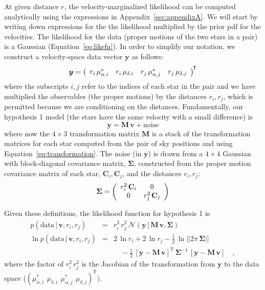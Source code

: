 \documentclass[manuscript, letterpaper]{aastex6}
\newcommand{\eqname}{Equation}
\newcommand{\given}{\,|\,}
\newcommand{\normal}{{\mathcal{N}}}
\newcommand{\transp}[1]{{#1}^{\!\mathsf{T}}}
\newcommand{\inv}[1]{{#1}^{-1}}
\newcommand{\bs}[1]{\boldsymbol{#1}}
\newcommand{\mat}[1]{\mathbf{#1}}
\renewcommand{\vec}[1]{\bs{#1}}
\newcommand{\data}{\mathrm{data}}
\begin{document}
At given distance $r$, the velocity-marginalized likelihood can be computed
analytically using the expressions in Appendix~\ref{sec:appendixA}.
We will start by writing down expressions for the the likelihood multiplied by
the prior pdf for the velocities.
The likelihood for the data (proper motions of the two stars in a pair)
is a Gaussian (\eqname~\ref{eq:likefn}).
In order to simplify our notation,
we construct a velocity-space data vector $\vec{y}$ as follows:
\begin{equation}
  \vec{y} =
    \transp{\left(
      \begin{array}{c c c c}
        r_i\,\mu_{\alpha,i}^* &
        r_i\,\mu_{\delta,i} &
        r_j\,\mu_{\alpha,j}^* &
        r_j\,\mu_{\delta,j}
      \end{array}
    \right)}
\end{equation}
where the subscripts $i,j$ refer to the indices of each star in the pair
and we have multiplied the observables (the proper motions) by the distances
$r_i, r_j$, which is permitted because we are conditioning on the distances.
Fundamentally, our hypothesis 1 model (the stars have the same velocity with a
small difference) is
\begin{equation}
  \vec{y} = \mat{M} \, \vec{v} + \mathrm{noise}
\end{equation}
where now the $4 \times 3$ transformation matrix $\mat{M}$ is a stack of the
transformation matrices for each star computed from the pair of sky positions
and using \eqname~\ref{eq:transformation}.
The noise (in $\vec{y}$) is drawn from a $4 \times 4$ Gaussian with
block-diagonal covariance matrix, $\mat{\Sigma}$, constructed from
the proper motion covariance matrix of each star,
$\mat{C}_i, \mat{C}_j$, and the distances
$r_i, r_j$:
\begin{equation}
  \mat{\Sigma} = \left(
    \begin{array}{c c}
      r_i^2 \, \mat{C}_i & 0 \\
      0 & r_j^2 \, \mat{C}_j
    \end{array}
  \right)
\end{equation}

Given these definitions, the likelihood function for hypothesis 1 is
\begin{eqnarray}
  p(\data \given \vec{v}, r_i, r_j) &=& r_i^2\,r_j^2\,
    \normal(\vec{y} \given \mat{M}\,\vec{v}, \mat{\Sigma}) \\
  \ln p(\data \given \vec{v}, r_i, r_j) &=& 2\,\ln r_i + 2\,\ln r_j
    -\frac{1}{2}\,\ln||2\pi\,\mat{\Sigma}|| \nonumber \\
    && \quad -\frac{1}{2}\,\transp{[\vec{y}-\mat{M}\,\vec{v}]}\,
      \inv{\mat{\Sigma}}\,
      [\vec{y}-\mat{M}\,\vec{v}]
  \quad ,
\end{eqnarray}
where the factor of $r_i^2\,r_j^2$ is the Jacobian of the transformation from $\vec{y}$
to the data space ($\transp{(\mu_{\alpha,i}^*\ \,\mu_{\delta,i}\ \,\mu_{\alpha,j}^*\ \,\mu_{\delta,j})}$).
\end{document}

